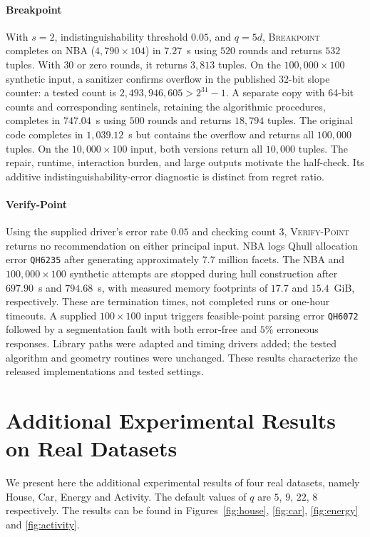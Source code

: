 \documentclass[conference]{IEEEtran}
\theoremstyle{definition}
\theoremstyle{plain}
\begin{document}
\paragraph{Breakpoint}
With $s=2$, indistinguishability threshold $0.05$, and $q=5d$, \textsc{Breakpoint} completes on NBA ($4{,}790\times104$) in $7.27$~s using $520$ rounds and returns $532$ tuples. With $30$ or zero rounds, it returns $3{,}813$ tuples. On the $100{,}000\times100$ synthetic input, a sanitizer confirms overflow in the published 32-bit slope counter: a tested count is $2{,}493{,}946{,}605>2^{31}-1$. A separate copy with 64-bit counts and corresponding sentinels, retaining the algorithmic procedures, completes in $747.04$~s using $500$ rounds and returns $18{,}794$ tuples. The original code completes in $1{,}039.12$~s but contains the overflow and returns all $100{,}000$ tuples. On the $10{,}000\times100$ input, both versions return all $10{,}000$ tuples. The repair, runtime, interaction burden, and large outputs motivate the half-check. Its additive indistinguishability-error diagnostic is distinct from regret ratio.

\paragraph{Verify-Point}
Using the supplied driver's error rate $0.05$ and checking count $3$, \textsc{Verify-Point} returns no recommendation on either principal input. NBA logs Qhull allocation error \texttt{QH6235} after generating approximately $7.7$ million facets. The NBA and $100{,}000\times100$ synthetic attempts are stopped during hull construction after $697.90$~s and $794.68$~s, with measured memory footprints of $17.7$ and $15.4$~GiB, respectively. These are termination times, not completed runs or one-hour timeouts. A supplied $100\times100$ input triggers feasible-point parsing error \texttt{QH6072} followed by a segmentation fault with both error-free and $5\%$ erroneous responses. Library paths were adapted and timing drivers added; the tested algorithm and geometry routines were unchanged. These results characterize the released implementations and tested settings.

\section{Additional Experimental Results on Real Datasets}
\label{appen:real}

We present here the additional experimental results of four real datasets, namely House, Car, Energy and Activity. The default values of $q$ are $5$, $9$, $22$, $8$ respectively. The results can be found in Figures~\ref{fig:house}, \ref{fig:car}, \ref{fig:energy} and \ref{fig:activity}.
\end{document}
